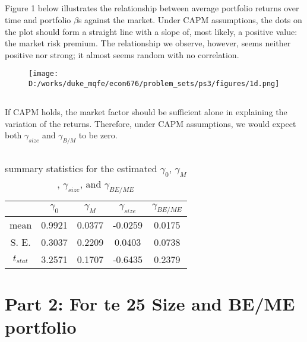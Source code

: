 \documentclass{report}
\begin{document}
\subsection{ }
Figure 1 below illustrates the relationship between average portfolio returns over time and portfolio $\beta$s against the market. Under CAPM assumptions, the dots on the plot should form a straight line with a slope of, most likely, a positive value: the market risk premium. The relationship we observe, however, seems neither positive nor strong; it almost seems random with no correlation. 

\begin{figure}[h]
	\centering
	\caption{ }
	\texttt{[image: D:/works/duke\_mqfe/econ676/problem\_sets/ps3/figures/1d.png]}
\end{figure}


\subsection{ }
If CAPM holds, the market factor should be sufficient alone in explaining the variation of the returns. Therefore, under CAPM assumptions, we would expect both $\gamma_{size}$ and $\gamma_{B/M}$ to be zero.

\subsection{ }


\begin{table}[ht]
\centering
\caption{summary statistics for the estimated $\gamma_0$, $\gamma_M$, $\gamma_{size}$, and $\gamma_{BE/ME}$}
\begin{tabular}{c | c | c | c | c}
		& $\gamma_0$	& $\gamma_M$	& $\gamma_{size}$	& $\gamma_{BE/ME}$	\\	[0.5ex] 	\hline
mean	& 0.9921		& 0.0377		& -0.0259			& 0.0175				\\
S. E.		& 0.3037		& 0.2209		& 0.0403			& 0.0738				\\
$t_{stat}$	& 3.2571		& 0.1707		& -0.6435			& 0.2379				\\ 	[0.5ex]	\hline \hline
\end{tabular}
\end{table}




\newpage
\section{Part 2: For te 25 Size and BE/ME portfolio}
\end{document}
